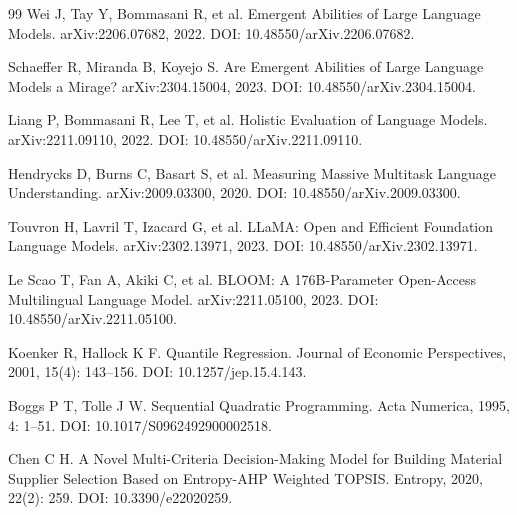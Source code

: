 \begin{thebibliography}{99}
Wei J, Tay Y, Bommasani R, et al.
Emergent Abilities of Large Language Models.
arXiv:2206.07682, 2022. DOI: 10.48550/arXiv.2206.07682.

Schaeffer R, Miranda B, Koyejo S.
Are Emergent Abilities of Large Language Models a Mirage?
arXiv:2304.15004, 2023. DOI: 10.48550/arXiv.2304.15004.

Liang P, Bommasani R, Lee T, et al.
Holistic Evaluation of Language Models.
arXiv:2211.09110, 2022. DOI: 10.48550/arXiv.2211.09110.

Hendrycks D, Burns C, Basart S, et al.
Measuring Massive Multitask Language Understanding.
arXiv:2009.03300, 2020. DOI: 10.48550/arXiv.2009.03300.

Touvron H, Lavril T, Izacard G, et al.
LLaMA: Open and Efficient Foundation Language Models.
arXiv:2302.13971, 2023. DOI: 10.48550/arXiv.2302.13971.

Le Scao T, Fan A, Akiki C, et al.
BLOOM: A 176B-Parameter Open-Access Multilingual Language Model.
arXiv:2211.05100, 2023. DOI: 10.48550/arXiv.2211.05100.

Koenker R, Hallock K F.
Quantile Regression.
Journal of Economic Perspectives, 2001, 15(4): 143--156. DOI: 10.1257/jep.15.4.143.

Boggs P T, Tolle J W.
Sequential Quadratic Programming.
Acta Numerica, 1995, 4: 1--51. DOI: 10.1017/S0962492900002518.

Chen C H.
A Novel Multi-Criteria Decision-Making Model for Building Material Supplier Selection Based on Entropy-AHP Weighted TOPSIS.
Entropy, 2020, 22(2): 259. DOI: 10.3390/e22020259.

\end{thebibliography}

